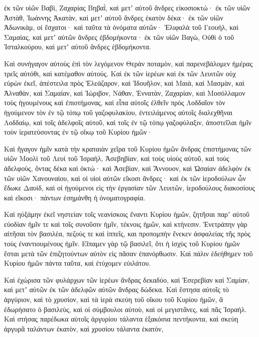 {ἐκ τῶν υἱῶν Βαβὶ, Ζαχαρίας Βηβαῒ, καὶ μετʼ αὐτοῦ ἄνδρες εἰκοσιοκτώ·
ἐκ τῶν υἱῶν Ἀστὰθ, Ἰωάννης Ἀκατὰν, καὶ μετʼ αὐτοῦ ἄνδρες ἑκατὸν δέκα·
ἐκ τῶν υἱῶν Ἀδωνικὰμ, οἱ ἔσχατοι· καὶ ταῦτα τὰ ὀνόματα αὐτῶν· Ἐλιφαλὰ τοῦ Γεουὴλ, καὶ Σαμαίας, καὶ μετʼ αὐτῶν ἄνδρες ἑβδομήκοντα·
ἐκ τῶν υἱῶν Βαγὼ, Οὐθὶ ὁ τοῦ Ἱσταλκούρου, καὶ μετʼ αὐτοῦ ἄνδρες ἑβδομήκοντα.
\par }{\PP {}Καὶ συνήγαγον αὐτοὺς ἐπὶ τὸν λεγόμενον Θερὰν ποταμὸν, καὶ παρενεβάλομεν ἡμέρας τρεῖς αὐτόθι, καὶ κατέμαθον αὐτούς.
Καὶ ἐκ τῶν ἱερέων καὶ ἐκ τῶν Λευιτῶν οὐχ εὑρὼν ἐκεῖ,
ἀπέστειλα πρὸς Ἐλεάζαρον, καὶ Ἱδουῆλον, καὶ Μαιὰ, καὶ Μασμὰν, καὶ Ἀλναθὰν, καὶ Σαμαίαν, καὶ Ἰώριβον, Νάθαν,
Ἐννατὰν, Ζαχαρίαν, καὶ Μοσόλλαμον τοὺς ἡγουμένους καὶ ἐπιοτήμονας,
καὶ εἶπα αὐτοῖς ἐλθεῖν πρὸς Λοδδαῖον τὸν ἡγούμενον τὸν ἐν τῷ τόπῳ τοῦ γαζοφυλακίου,
ἐντειλάμενος αὐτοῖς διαλεχθῆναι Λοδδαίῳ, καὶ τοῖς ἀδελφοῖς αὐτοῦ, καὶ τοῖς ἐν τῷ τόπῳ γαζοφύλαξιν, ἀποστεῖλαι ἡμῖν τοὺν ἱερατεύσοντας ἐν τῷ οἴκῳ τοῦ Κυρίου ἡμῶν·
\par }{\PP {}Καὶ ἤγαγον ἡμῖν κατὰ τὴν κραταιὰν χεῖρα τοῦ Κυρίου ἡμῶν ἄνδρας ἐπιστήμονας τῶν υἱῶν Μοολὶ τοῦ Λευὶ τοῦ Ἰσραὴλ, Ἀσεβηβίαν, καὶ τοὺς υἱοὺς αὐτοῦ, καὶ τοὺς ἀδελφοὺς, ὄντας δέκα καὶ ὀκτώ·
καὶ Ἀσεβίαν, καὶ Ἄννουον, καὶ Ὠσαίαν ἀδελφὸν ἐκ τῶν υἱῶν Χανουναίου, καὶ οἱ υἱοὶ αὐτῶν εἴκοσι ἄνδρες·
καὶ ἐκ τῶν ἱεροδούλων ὧν ἔδωκε Δαυὶδ, καὶ οἱ ἡγούμενοι εἰς τὴν ἐργασίαν τῶν Λευιτῶν, ἱεροδούλους διακοσίους καὶ εἴκοσι· πάντων ἐσημάνθη ἡ ὀνοματογραφία.
\par }{\PP {}Καὶ ηὐξάμην ἐκεῖ νηστείαν τοῖς νεανίσκοις ἔναντι Κυρίου ἡμῶν, ζητῆσαι παρʼ αὐτοῦ εὐοδίαν ἡμῖν τε καὶ τοῖς συνοῦσιν ἡμῖν, τέκνοις ἡμῶν, καὶ κτήνεσιν.
Ἐνετράπην γὰρ αἰτῆσαι τὸν βασιλέα, πεζούς τε καὶ ἱππεῖς, και προπομπὴν ἕνεκεν ἀσφαλείας τῆς πρὸς τοὺς ἐναντιουμένους ἡμῖν.
Εἴπαμεν γὰρ τῷ βασιλεῖ, ὅτι ἡ ἰσχὺς τοῦ Κυρίου ἡμῶν ἔσται μετὰ τῶν ἐπιζητούντων αὐτὸν εἰς πᾶσαν ἐπανόρθωσιν.
Καὶ πάλιν ἐδεήθημεν τοῦ Κυρίου ἡμῶν πάντα ταῦτα, καὶ ἐτύχομεν εὐιλάτου.
\par }{\PP {}Καὶ ἐχώρισα τῶν φυλάρχων τῶν ἱερέων ἄνδρας δεκαδύο, καὶ Ἐσερεβίαν καὶ Σαμίαν, καὶ μετʼ αὐτῶν ἐκ τῶν ἀδελφῶν αὐτῶν ἄνδρας δώδεκα.
Καὶ ἔστησα αὐτοῖς τὸ ἀργύριον, καὶ τὸ χρυσίον, καὶ τὰ ἱερὰ σκεύη τοῦ οἴκου τοῦ Κυρίου ἡμῶν, ἃ ἐδωρήσατο ὁ βασιλεὺς, καὶ οἱ σύμβουλοι αὐτοὺ, καὶ οἱ μεγιστᾶνες, καὶ πᾶς Ἰσραήλ.
Καὶ στήσας παρέδωκα αὑτοῖς ἀργυρίου τάλαντα ἑξακόσια πεντήκοντα, καὶ σκεύη ἀργυρᾶ ταλάντων ἑκατὸν, καὶ χρυσίου τάλαντα ἑκατὸν,
}

